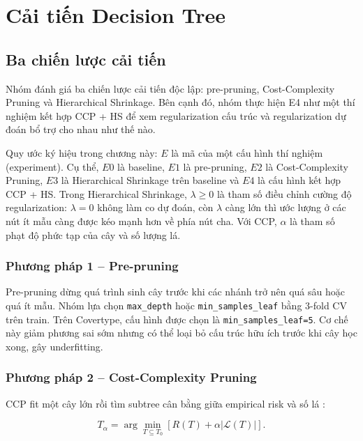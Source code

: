 \chapter{Cải tiến Decision Tree}

\section{Ba chiến lược cải tiến}

Nhóm đánh giá ba chiến lược cải tiến độc lập: pre-pruning, Cost-Complexity Pruning và Hierarchical Shrinkage. Bên cạnh đó, nhóm thực hiện E4 như một thí nghiệm kết hợp CCP + HS để xem regularization cấu trúc và regularization dự đoán bổ trợ cho nhau như thế nào.

Quy ước ký hiệu trong chương này: $E$ là mã của một cấu hình thí nghiệm (experiment). Cụ thể,
$E0$ là baseline, $E1$ là pre-pruning, $E2$ là Cost-Complexity Pruning, $E3$ là
Hierarchical Shrinkage trên baseline và $E4$ là cấu hình kết hợp CCP + HS. Trong
Hierarchical Shrinkage, $\lambda \geq 0$ là tham số điều chỉnh cường độ regularization:
$\lambda=0$ không làm co dự đoán, còn $\lambda$ càng lớn thì ước lượng ở các nút ít mẫu
càng được kéo mạnh hơn về phía nút cha. Với CCP, $\alpha$ là tham số phạt độ phức tạp
của cây và số lượng lá.

\subsection{Phương pháp 1 -- Pre-pruning}

Pre-pruning dừng quá trình sinh cây trước khi các nhánh trở nên quá sâu hoặc quá ít mẫu. Nhóm lựa chọn \texttt{max\_depth} hoặc \texttt{min\_samples\_leaf} bằng 3-fold CV trên train. Trên Covertype, cấu hình được chọn là \texttt{min\_samples\_leaf=5}. Cơ chế này giảm phương sai sớm nhưng có thể loại bỏ cấu trúc hữu ích trước khi cây học xong, gây underfitting.

\subsection{Phương pháp 2 -- Cost-Complexity Pruning}

CCP fit một cây lớn rồi tìm subtree cân bằng giữa empirical risk và số lá \cite{breiman1984cart,sklearnTree}:

\begin{equation}
    T_{\alpha}=\arg\min_{T\subseteq T_0}\left[R(T)+\alpha\lvert\mathcal{L}(T)\rvert\right].
    \label{eq:ccp}
\end{equation}

